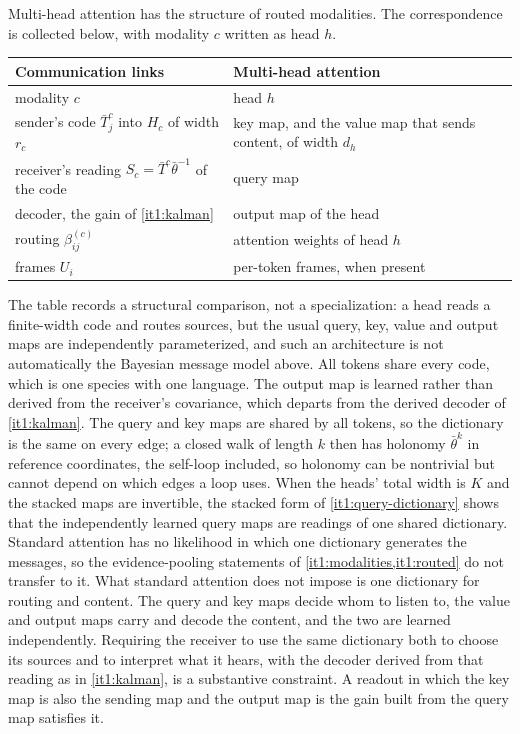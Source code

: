 \documentclass[11pt,letterpaper]{report}
\begin{document}
Multi-head attention \citep{Vaswani2017} has the structure of routed modalities. The correspondence is collected below, with modality $c$ written as head $h$.
\begin{center}
\small
\begin{tabular}{@{}p{}p{}@{}}
\toprule
Communication links & Multi-head attention\\
\midrule
modality $c$ & head $h$\\
sender's code $\bar T_j^c$ into $H_c$ of width $r_c$ & key map, and the value map that sends content, of width $d_h$\\
receiver's reading $S_c=\bar T^c\bar\theta^{-1}$ of the code & query map\\
decoder, the gain of \cref{it1:kalman} & output map of the head\\
routing $\beta^{(c)}_{ij}$ & attention weights of head $h$\\
frames $U_i$ & per-token frames, when present\\
\bottomrule
\end{tabular}
\end{center}
The table records a structural comparison, not a specialization: a head reads a finite-width code and routes sources, but the usual query, key, value and output maps are independently parameterized, and such an architecture is not automatically the Bayesian message model above. All tokens share every code, which is one species with one language. The output map is learned rather than derived from the receiver's covariance, which departs from the derived decoder of \cref{it1:kalman}. The query and key maps are shared by all tokens, so the dictionary is the same on every edge; a closed walk of length $k$ then has holonomy $\bar\theta^k$ in reference coordinates, the self-loop included, so holonomy can be nontrivial but cannot depend on which edges a loop uses. When the heads' total width is $K$ and the stacked maps are invertible, the stacked form of \cref{it1:query-dictionary} shows that the independently learned query maps are readings of one shared dictionary. Standard attention has no likelihood in which one dictionary generates the messages, so the evidence-pooling statements of \cref{it1:modalities,it1:routed} do not transfer to it. What standard attention does not impose is one dictionary for routing and content. The query and key maps decide whom to listen to, the value and output maps carry and decode the content, and the two are learned independently. Requiring the receiver to use the same dictionary both to choose its sources and to interpret what it hears, with the decoder derived from that reading as in \cref{it1:kalman}, is a substantive constraint. A readout in which the key map is also the sending map and the output map is the gain built from the query map satisfies it.
\end{document}
